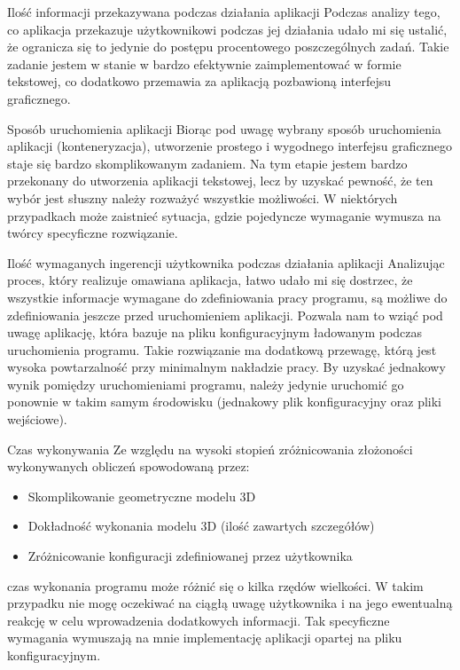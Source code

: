 \documentclass[a4paper,12pt,twoside,openany]{report}
\begin{document}
    \begin{subsection}{Ilość informacji przekazywana podczas działania aplikacji}
      Podczas analizy tego, co aplikacja przekazuje użytkownikowi podczas jej działania udało mi się ustalić,
      że ogranicza się to jedynie do postępu procentowego poszczególnych zadań. Takie zadanie jestem w stanie w bardzo efektywnie
      zaimplementować w formie tekstowej, co dodatkowo przemawia za aplikacją pozbawioną interfejsu graficznego.
    \end{subsection}

    \begin{subsection}{Sposób uruchomienia aplikacji}
      Biorąc pod uwagę wybrany sposób uruchomienia aplikacji (konteneryzacja), utworzenie prostego i wygodnego interfejsu graficznego
      staje się bardzo skomplikowanym zadaniem. Na tym etapie jestem bardzo przekonany do utworzenia aplikacji tekstowej, lecz by uzyskać 
      pewność, że ten wybór jest słuszny należy rozważyć wszystkie możliwości. W niektórych przypadkach może zaistnieć sytuacja, gdzie pojedyncze 
      wymaganie wymusza na twórcy specyficzne rozwiązanie.
    \end{subsection}

    \begin{subsection}{Ilość wymaganych ingerencji użytkownika podczas działania aplikacji}
      Analizując proces, który realizuje omawiana aplikacja, łatwo udało mi się dostrzec, że wszystkie informacje wymagane do 
      zdefiniowania pracy programu, są możliwe do zdefiniowania jeszcze przed uruchomieniem aplikacji.
      Pozwala nam to wziąć pod uwagę aplikację, która bazuje na pliku konfiguracyjnym ładowanym podczas uruchomienia programu.
      Takie rozwiązanie ma dodatkową przewagę, którą jest wysoka powtarzalność przy minimalnym nakładzie pracy.
      By uzyskać jednakowy wynik pomiędzy uruchomieniami programu, należy jedynie uruchomić go ponownie w takim samym środowisku 
      (jednakowy plik konfiguracyjny oraz pliki wejściowe).
    \end{subsection}

    \begin{subsection}{Czas wykonywania}
      Ze względu na wysoki stopień zróżnicowania złożoności wykonywanych obliczeń spowodowaną przez:
      \begin{itemize}
        \item Skomplikowanie geometryczne modelu 3D
        \item Dokładność wykonania modelu 3D (ilość zawartych szczegółów)
        \item Zróżnicowanie konfiguracji zdefiniowanej przez użytkownika
      \end{itemize}
      czas wykonania programu może różnić się o kilka rzędów wielkości. W takim przypadku nie mogę oczekiwać na ciągłą uwagę użytkownika i 
      na jego ewentualną reakcję w celu wprowadzenia dodatkowych informacji. Tak specyficzne wymagania wymuszają na mnie implementację 
      aplikacji opartej na pliku konfiguracyjnym.
    \end{subsection}
\end{document}

